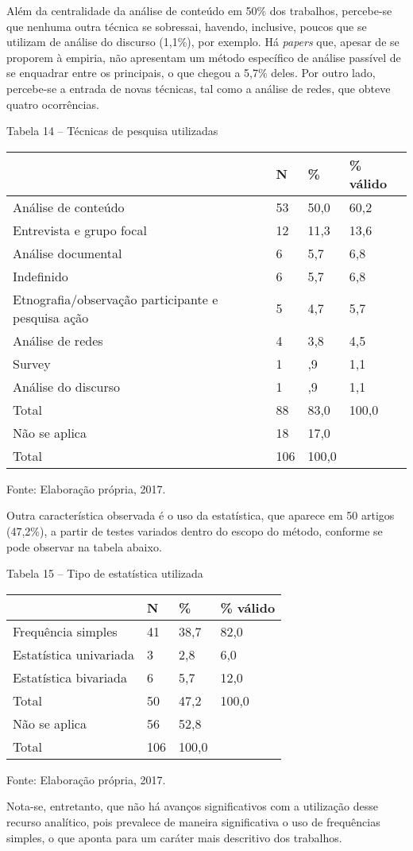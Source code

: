 Além da centralidade da análise de conteúdo em 50\% dos trabalhos,
percebe-se que nenhuma outra técnica se sobressai, havendo, inclusive,
poucos que se utilizam de análise do discurso (1,1\%), por exemplo. Há
\emph{papers} que, apesar de se proporem à empiria, não apresentam um
método específico de análise passível de se enquadrar entre os
principais, o que chegou a 5,7\% deles. Por outro lado, percebe-se a
entrada de novas técnicas, tal como a análise de redes, que obteve
quatro ocorrências.

Tabela 14 -- Técnicas de pesquisa utilizadas

\begin{longtable}[]{@{}llll@{}}
\toprule
~ & N & \% & \% válido\tabularnewline
\midrule
\endhead
Análise de conteúdo & 53 & 50,0 & 60,2\tabularnewline
Entrevista e grupo focal & 12 & 11,3 & 13,6\tabularnewline
Análise documental & 6 & 5,7 & 6,8\tabularnewline
Indefinido & 6 & 5,7 & 6,8\tabularnewline
Etnografia/observação participante e pesquisa ação & 5 & 4,7 &
5,7\tabularnewline
Análise de redes & 4 & 3,8 & 4,5\tabularnewline
Survey & 1 & ,9 & 1,1\tabularnewline
Análise do discurso & 1 & ,9 & 1,1\tabularnewline
Total & 88 & 83,0 & 100,0\tabularnewline
Não se aplica & 18 & 17,0 &\tabularnewline
Total & 106 & 100,0 & ~\tabularnewline
\bottomrule
\end{longtable}

Fonte: Elaboração própria, 2017.

Outra característica observada é o uso da estatística, que aparece em 50
artigos (47,2\%), a partir de testes variados dentro do escopo do
método, conforme se pode observar na tabela abaixo.

Tabela 15 -- Tipo de estatística utilizada

\begin{longtable}[]{@{}llll@{}}
\toprule
~ & N & \% & \% válido\tabularnewline
\midrule
\endhead
Frequência simples & 41 & 38,7 & 82,0\tabularnewline
Estatística univariada & 3 & 2,8 & 6,0\tabularnewline
Estatística bivariada & 6 & 5,7 & 12,0\tabularnewline
Total & 50 & 47,2 & 100,0\tabularnewline
Não se aplica & 56 & 52,8 &\tabularnewline
Total & 106 & 100,0 & ~\tabularnewline
\bottomrule
\end{longtable}

Fonte: Elaboração própria, 2017.

Nota-se, entretanto, que não há avanços significativos com a utilização
desse recurso analítico, pois prevalece de maneira significativa o uso
de frequências simples, o que aponta para um caráter mais descritivo dos
trabalhos.

